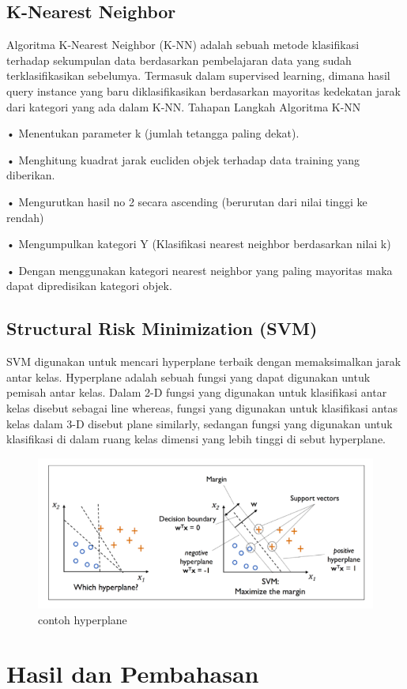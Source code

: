 \documentclass[conference]{IEEEtran}
\begin{document}
\subsection{K-Nearest Neighbor}
Algoritma K-Nearest Neighbor (K-NN) adalah sebuah
metode klasifikasi terhadap sekumpulan data berdasarkan
pembelajaran data yang sudah terklasifikasikan sebelumya.
Termasuk dalam supervised learning, dimana hasil query
instance yang baru diklasifikasikan berdasarkan mayoritas
kedekatan jarak dari kategori yang ada dalam K-NN.
Tahapan Langkah Algoritma K-NN

• Menentukan parameter k (jumlah tetangga paling dekat).

• Menghitung kuadrat jarak eucliden objek terhadap data
training yang diberikan.

• Mengurutkan hasil no 2 secara ascending (berurutan dari
nilai tinggi ke rendah)

• Mengumpulkan kategori Y (Klasifikasi nearest neighbor
berdasarkan nilai k)

• Dengan menggunakan kategori nearest neighbor yang
paling mayoritas maka dapat dipredisikan kategori objek.

\subsection{Structural Risk Minimization (SVM)}
SVM digunakan untuk mencari hyperplane terbaik dengan
memaksimalkan jarak antar kelas. Hyperplane adalah sebuah
fungsi yang dapat digunakan untuk pemisah antar kelas.
Dalam 2-D fungsi yang digunakan untuk klasifikasi antar
kelas disebut sebagai line whereas, fungsi yang digunakan
untuk klasifikasi antas kelas dalam 3-D disebut plane similarly,
sedangan fungsi yang digunakan untuk klasifikasi di dalam
ruang kelas dimensi yang lebih tinggi di sebut hyperplane.

\begin{figure}
\centering
\includegraphics[width=.4\textwidth]{Gambar/gambar8.png}
\caption{contoh hyperplane}
\end{figure}

\section{Hasil dan Pembahasan}
\end{document}
